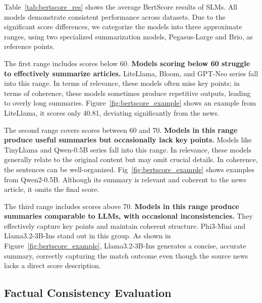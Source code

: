 Table~\ref{tab:bertscore_res} shows the average BertScore results of SLMs. All models demonstrate consistent performance across datasets. Due to the significant score differences, we categorize the models into three approximate ranges, using two specialized summarization models, Pegasus-Large and Brio, as reference points.


The first range includes scores below 60. \textbf{Models scoring below 60 struggle to effectively summarize articles.} LiteLlama, Bloom, and GPT-Neo series fall into this range. In terms of relevance, these models often miss key points; in terms of coherence, these models sometimes produce repetitive outputs, leading to overly long summaries. Figure~\ref{fig:bertscore_example} shows an example from LiteLlama, it scores only 40.81, deviating significantly from the news.


The second range covers scores between 60 and 70. \textbf{Models in this range produce useful summaries but occasionally lack key points.} Models like TinyLlama and Qwen-0.5B series fall into this range. In relevance, these models generally relate to the original content but may omit crucial details. In coherence, the sentences can be well-organized. Fig~\ref{fig:bertscore_example} shows examples from Qwen2-0.5B. Although its summary is relevant and coherent to the news article, it omits the final score.


The third range includes scores above 70. \textbf{Models in this range produce summaries comparable to LLMs, with occasional inconsistencies.} They effectively capture key points and maintain coherent structure. Phi3-Mini and Llama3.2-3B-Ins stand out in this group. As shown in Figure~\ref{fig:bertscore_example}, Llama3.2-3B-Ins generates a concise, accurate summary, correctly capturing the match outcome even though the source news lacks a direct score description.







\subsection{Factual Consistency Evaluation}


